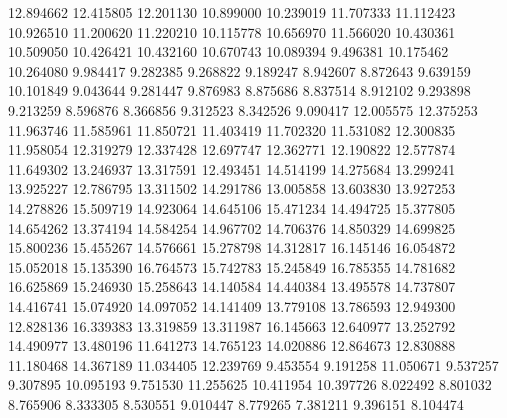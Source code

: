 12.894662
12.415805
12.201130
10.899000
10.239019
11.707333
11.112423
10.926510
11.200620
11.220210
10.115778
10.656970
11.566020
10.430361
10.509050
10.426421
10.432160
10.670743
10.089394
9.496381
10.175462
10.264080
9.984417
9.282385
9.268822
9.189247
8.942607
8.872643
9.639159
10.101849
9.043644
9.281447
9.876983
8.875686
8.837514
8.912102
9.293898
9.213259
8.596876
8.366856
9.312523
8.342526
9.090417
12.005575
12.375253
11.963746
11.585961
11.850721
11.403419
11.702320
11.531082
12.300835
11.958054
12.319279
12.337428
12.697747
12.362771
12.190822
12.577874
11.649302
13.246937
13.317591
12.493451
14.514199
14.275684
13.299241
13.925227
12.786795
13.311502
14.291786
13.005858
13.603830
13.927253
14.278826
15.509719
14.923064
14.645106
15.471234
14.494725
15.377805
14.654262
13.374194
14.584254
14.967702
14.706376
14.850329
14.699825
15.800236
15.455267
14.576661
15.278798
14.312817
16.145146
16.054872
15.052018
15.135390
16.764573
15.742783
15.245849
16.785355
14.781682
16.625869
15.246930
15.258643
14.140584
14.440384
13.495578
14.737807
14.416741
15.074920
14.097052
14.141409
13.779108
13.786593
12.949300
12.828136
16.339383
13.319859
13.311987
16.145663
12.640977
13.252792
14.490977
13.480196
11.641273
14.765123
14.020886
12.864673
12.830888
11.180468
14.367189
11.034405
12.239769
9.453554
9.191258
11.050671
9.537257
9.307895
10.095193
9.751530
11.255625
10.411954
10.397726
8.022492
8.801032
8.765906
8.333305
8.530551
9.010447
8.779265
7.381211
9.396151
8.104474

